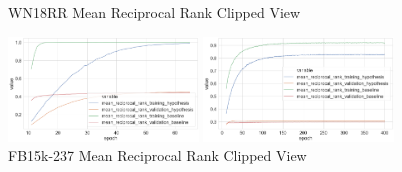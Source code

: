 \begin{figure}[H]
	\parbox{.5\linewidth}{
   		\caption{WN18RR Mean Reciprocal Rank Clipped View}
   		\centering
    		\includegraphics[width=0.45\textwidth, height=0.2\textheight]{WN18RR_mean_reciprocal_rank_Results_Clipped}
		}
	\hfill
	\parbox{.5\linewidth}{
		\caption{FB15k-237 Mean Reciprocal Rank Clipped View}
   		\centering
		\includegraphics[width=0.45\textwidth, height=0.2\textheight]{FB15k-237_mean_reciprocal_rank_Results_Clipped}
		}
\end{figure}


